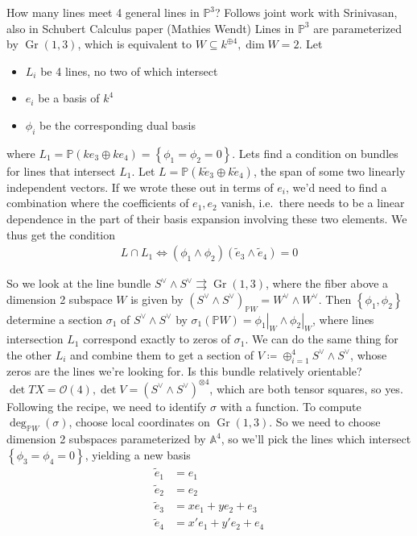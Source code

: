 \begin{example}[?]

How many lines meet 4 general lines in \({\mathbb{P}}^3\)? Follows joint
work with Srinivasan, also in Schubert Calculus paper (Mathies Wendt)
Lines in \({\mathbb{P}}^3\) are parameterized by
\({\operatorname{Gr}}(1,3)\), which is equivalent to
\(W \subseteq k^{\oplus 4}, \dim W = 2\). Let

\begin{itemize}
\tightlist
\item
  \(L_i\) be 4 lines, no two of which intersect
\item
  \(e_i\) be a basis of \(k^4\)
\item
  \(\phi_i\) be the corresponding dual basis
\end{itemize}

where
\(L_1 = {\mathbb{P}}(ke_3\oplus ke_4) = \left\{{\phi_1=\phi_2 = 0}\right\}\).
Lets find a condition on bundles for lines that intersect \(L_1\). Let
\(L= {\mathbb{P}}(k\tilde e_3 \oplus k\tilde e_4)\), the span of some
two linearly independent vectors. If we wrote these out in terms of
\(e_i\), we'd need to find a combination where the coefficients of
\(e_1, e_2\) vanish, i.e.~there needs to be a linear dependence in the
part of their basis expansion involving these two elements. We thus get
the condition
\begin{align*}
L\cap L_1 \iff (\phi_1 \wedge \phi_2)(\tilde e_3 \wedge \tilde e_4) = 0
\end{align*}

So we look at the line bundle
\(S^\vee\wedge S^\vee\rightrightarrows{\operatorname{Gr}}(1,3)\), where
the fiber above a dimension 2 subspace \(W\) is given by
\((S^\vee\wedge S^\vee)_{{\mathbb{P}}W} = W^\vee\wedge W^\vee\). Then
\(\left\{{\phi_1, \phi_2}\right\}\) determine a section \(\sigma_1\) of
\(S^\vee\wedge S^\vee\) by
\(\sigma_1({\mathbb{P}}W) = {\left.{{\phi_1}} \right|_{{W}} } \wedge {\left.{{\phi_2}} \right|_{{W}} }\),
where lines intersection \(L_1\) correspond exactly to zeros of
\(\sigma_1\). We can do the same thing for the other \(L_i\) and combine
them to get a section of
\(V \coloneqq\oplus_{i=1}^4S^\vee\wedge S^\vee\), whose zeros are the
lines we're looking for. Is this bundle relatively orientable?
\(\det TX ={\mathcal{O}}(4), \det V = (S^\vee\wedge S^\vee)^{\otimes 4}\),
which are both tensor squares, so yes. Following the recipe, we need to
identify \(\sigma\) with a function. To compute
\(\deg_{{\mathbb{P}}W}(\sigma)\), choose local coordinates on
\({\operatorname{Gr}}(1,3)\). So we need to choose dimension 2 subspaces
parameterized by \({\mathbb{A}}^4\), so we'll pick the lines which
intersect \(\left\{{\phi_3= \phi_4 = 0}\right\}\), yielding a new basis
\begin{align*} \tilde e_1 &= e_1 \\ \tilde e_2 &= e_2 \\ \tilde e_3 &= xe_1 + ye_2 + e_3 \\ \tilde e_4 &= x'e_1 + y'e_2 + e_4 \end{align*}


\end{example}
